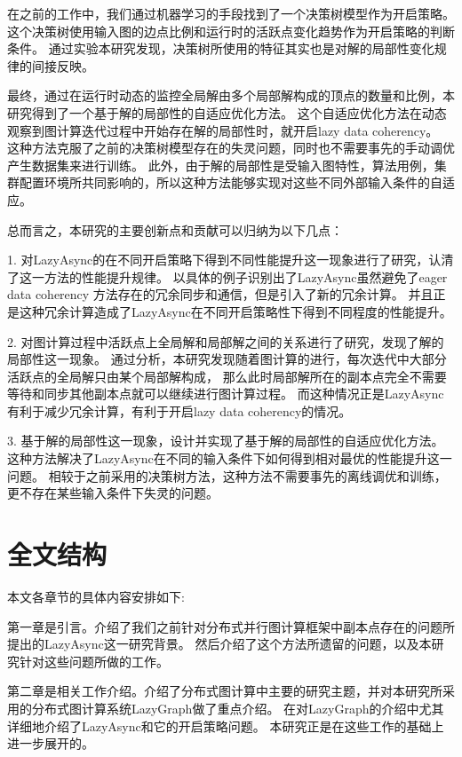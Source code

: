 在之前的工作中，我们通过机器学习的手段找到了一个决策树模型作为开启策略。
这个决策树使用输入图的边点比例和运行时的活跃点变化趋势作为开启策略的判断条件。
通过实验本研究发现，决策树所使用的特征其实也是对解的局部性变化规律的间接反映。

最终，通过在运行时动态的监控全局解由多个局部解构成的顶点的数量和比例，本研究得到了一个基于解的局部性的自适应优化方法。
这个自适应优化方法在动态观察到图计算迭代过程中开始存在解的局部性时，就开启lazy data coherency。
这种方法克服了之前的决策树模型存在的失灵问题，同时也不需要事先的手动调优产生数据集来进行训练。
此外，由于解的局部性是受输入图特性，算法用例，集群配置环境所共同影响的，所以这种方法能够实现对这些不同外部输入条件的自适应。

总而言之，本研究的主要创新点和贡献可以归纳为以下几点：

1. 对LazyAsync的在不同开启策略下得到不同性能提升这一现象进行了研究，认清了这一方法的性能提升规律。
以具体的例子识别出了LazyAsync虽然避免了eager data coherency 方法存在的冗余同步和通信，但是引入了新的冗余计算。
并且正是这种冗余计算造成了LazyAsync在不同开启策略性下得到不同程度的性能提升。

2. 对图计算过程中活跃点上全局解和局部解之间的关系进行了研究，发现了解的局部性这一现象。
通过分析，本研究发现随着图计算的进行，每次迭代中大部分活跃点的全局解只由某个局部解构成，
那么此时局部解所在的副本点完全不需要等待和同步其他副本点就可以继续进行图计算过程。
而这种情况正是LazyAsync有利于减少冗余计算，有利于开启lazy data coherency的情况。

3. 基于解的局部性这一现象，设计并实现了基于解的局部性的自适应优化方法。
这种方法解决了LazyAsync在不同的输入条件下如何得到相对最优的性能提升这一问题。
相较于之前采用的决策树方法，这种方法不需要事先的离线调优和训练，更不存在某些输入条件下失灵的问题。




\section{全文结构}
本文各章节的具体内容安排如下:

第一章是引言。介绍了我们之前针对分布式并行图计算框架中副本点存在的问题所提出的LazyAsync这一研究背景。
然后介绍了这个方法所遗留的问题，以及本研究针对这些问题所做的工作。

第二章是相关工作介绍。介绍了分布式图计算中主要的研究主题，并对本研究所采用的分布式图计算系统LazyGraph做了重点介绍。
在对LazyGraph的介绍中尤其详细地介绍了LazyAsync和它的开启策略问题。
本研究正是在这些工作的基础上进一步展开的。

